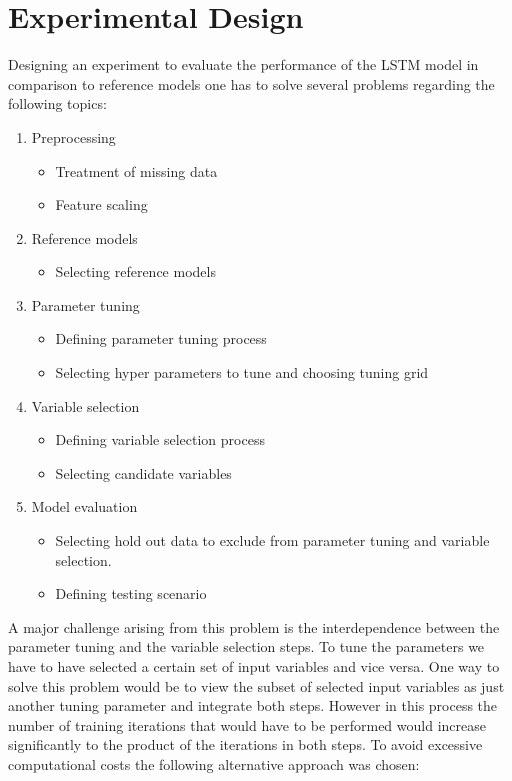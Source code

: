 \chapter{Experimental Design}
Designing an experiment to evaluate the performance of the LSTM model in comparison to reference models one has to solve several problems regarding the following topics:
\begin{enumerate}
\item Preprocessing\begin{itemize}
	\item Treatment of missing data
	\item Feature scaling
\end{itemize}
\item Reference models\begin{itemize}
	\item Selecting reference models
\end{itemize}
\item Parameter tuning \begin{itemize}
	\item Defining parameter tuning process
	\item Selecting hyper parameters to tune and choosing tuning grid
\end{itemize}
\item Variable selection \begin{itemize}
	\item Defining variable selection process
	\item Selecting candidate variables
\end{itemize}
\item Model evaluation \begin{itemize}
\item Selecting hold out data to exclude from parameter tuning and variable selection.
\item Defining testing scenario
\end{itemize}	
\end{enumerate}

A major challenge arising from this problem is the interdependence between the parameter tuning and the variable selection steps. To tune the parameters we have to have selected a certain set of input variables and vice versa. One way to solve this problem would be to view the subset of selected input variables as just another tuning parameter and integrate both steps. However in this process the number of training iterations that would have to be performed would increase significantly to the product of the iterations in both steps. To avoid excessive computational costs the following alternative approach was chosen:

